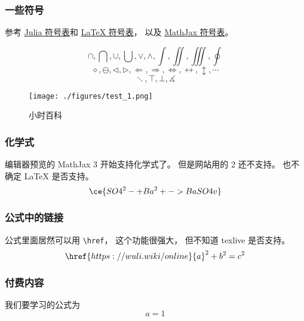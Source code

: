 
\subsubsection{一些符号}
参考 \href{https://docs.julialang.org/en/v1/manual/unicode-input/}{Julia 符号表}和 \href{https://oeis.org/wiki/List_of_LaTeX_mathematical_symbols}{LaTeX 符号表}， 以及 \href{http://www.onemathematicalcat.org/MathJaxDocumentation/TeXSyntax.htm}{MathJax 符号表}。

\begin{equation}
\cap, \bigcap, \cup, \bigcup, \vee, \wedge, \int, \iint, \iiint, \oint
\end{equation}
\begin{equation}
\diamond, \ominus, \triangleleft, \triangleright, \Longleftarrow, \Longrightarrow, \iff, \leftrightarrow, \updownarrow, \cdots
\end{equation}
\begin{equation}
\ddots, \top, \bot, \measuredangle
\end{equation}

\begin{figure}[ht]
\centering
\texttt{[image: ./figures/test\_1.png]}
\caption{小时百科} \label{test_fig1}
\end{figure}

\subsubsection{化学式}
编辑器预览的 MathJax 3 开始支持化学式了。 但是网站用的 2 还不支持。 也不确定 LaTeX 是否支持。
\begin{equation}
\ce{SO4^2- + Ba^2+ -> BaSO4 v}
\end{equation}

\subsubsection{公式中的链接}
公式里面居然可以用 \verb|\href|， 这个功能很强大， 但不知道 texlive 是否支持。
\begin{equation}
\href{https://wuli.wiki/online}{a}^2 + b^2 = c^2
\end{equation}

\subsubsection{付费内容}
我们要学习的公式为
\begin{equation}\label{test_eq1}
a = 1
\end{equation}

